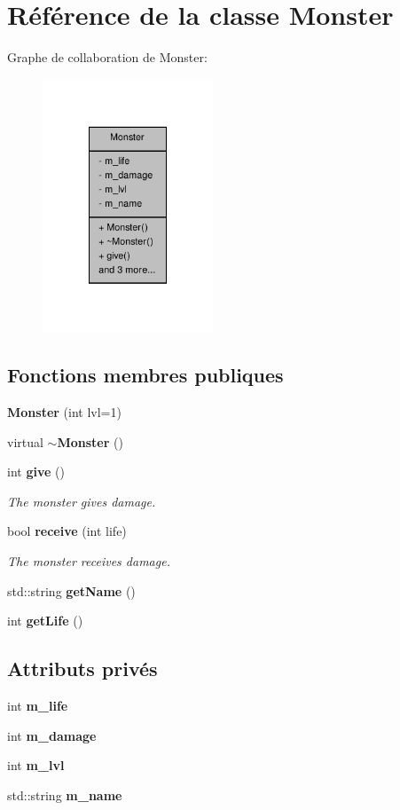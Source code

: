 \section{Référence de la classe Monster}
\label{class_monster}


Graphe de collaboration de Monster\-:\nopagebreak
\begin{figure}[H]
\begin{center}
\leavevmode
\includegraphics[width=144pt]{class_monster__coll__graph}
\end{center}
\end{figure}
\subsection*{Fonctions membres publiques}
\begin{DoxyCompactItemize}
\item 
{\bf Monster} (int lvl=1)
\item 
virtual {\bf $\sim$\-Monster} ()
\item 
int {\bf give} ()
\begin{DoxyCompactList}\small\item\em The monster gives damage. \end{DoxyCompactList}\item 
bool {\bf receive} (int life)
\begin{DoxyCompactList}\small\item\em The monster receives damage. \end{DoxyCompactList}\item 
std\-::string {\bf get\-Name} ()
\item 
int {\bf get\-Life} ()
\end{DoxyCompactItemize}
\subsection*{Attributs privés}
\begin{DoxyCompactItemize}
\item 
int {\bf m\-\_\-life}
\item 
int {\bf m\-\_\-damage}
\item 
int {\bf m\-\_\-lvl}
\item 
std\-::string {\bf m\-\_\-name}
\end{DoxyCompactItemize}



